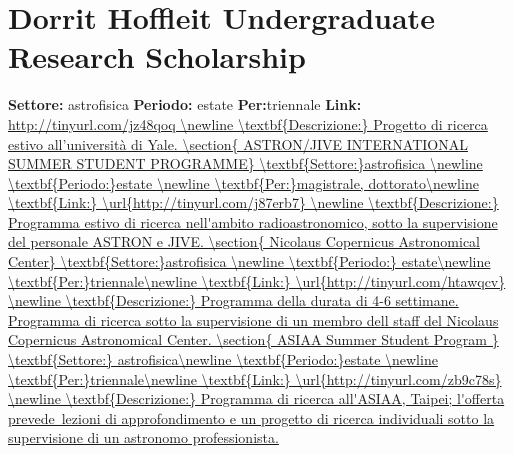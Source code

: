 \documentclass[a4paper,10pt]{article}
\begin{document}
\section{	Dorrit Hoffleit Undergraduate Research Scholarship	}
\textbf{Settore:} astrofisica\newline
\textbf{Periodo:} estate\newline
\textbf{Per:}triennale\newline
\textbf{Link:} \url{http://tinyurl.com/jz48qoq \newline
\textbf{Descrizione:} Progetto di ricerca estivo all’università di Yale.	

\section{	ASTRON/JIVE INTERNATIONAL SUMMER STUDENT PROGRAMME}	
\textbf{Settore:}astrofisica \newline
\textbf{Periodo:}estate \newline
\textbf{Per:}magistrale, dottorato\newline
\textbf{Link:} \url{http://tinyurl.com/j87erb7} \newline
\textbf{Descrizione:} Programma estivo di ricerca nell'ambito radioastronomico, sotto la supervisione del personale ASTRON e JIVE.	

\section{	Nicolaus Copernicus Astronomical Center}	
\textbf{Settore:}astrofisica \newline
\textbf{Periodo:} estate\newline
\textbf{Per:}triennale\newline
\textbf{Link:} \url{http://tinyurl.com/htawqcv} \newline
\textbf{Descrizione:} Programma della durata di 4-6 settimane. Programma di ricerca sotto la supervisione di un membro dell staff del Nicolaus Copernicus Astronomical Center.	

\section{	ASIAA Summer Student Program	}
\textbf{Settore:} astrofisica\newline
\textbf{Periodo:}estate \newline
\textbf{Per:}triennale\newline
\textbf{Link:} \url{http://tinyurl.com/zb9c78s} \newline
\textbf{Descrizione:}  	Programma di ricerca all'ASIAA, Taipei; l'offerta prevede lezioni di approfondimento e un progetto di ricerca individuali sotto la supervisione di un astronomo professionista.	

}
\end{document}
